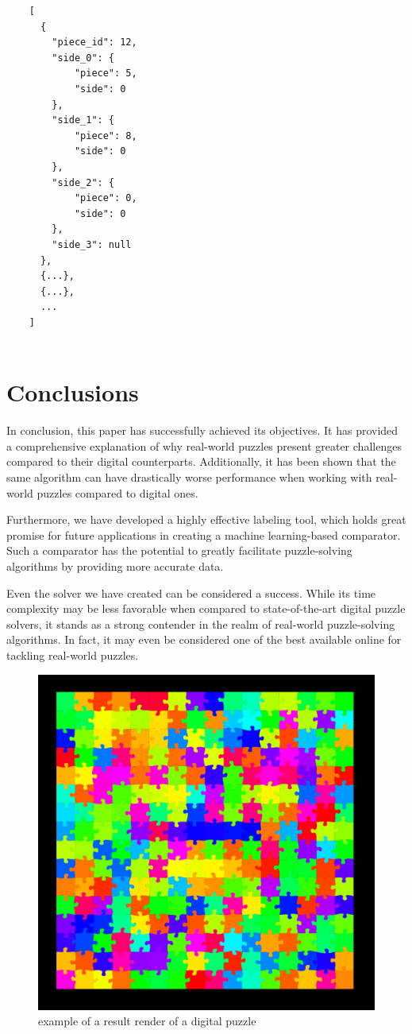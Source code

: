 \documentclass{article}
\begin{document}
\begin{minipage}{\textwidth}
  \begin{lstlisting}
    [
      {
        "piece_id": 12,
        "side_0": {
            "piece": 5,
            "side": 0
        },
        "side_1": {
            "piece": 8,
            "side": 0
        },
        "side_2": {
            "piece": 0,
            "side": 0
        },
        "side_3": null
      },
      {...},
      {...},
      ...
    ]
  
  \end{lstlisting}
\end{minipage}

\section{Conclusions}
In conclusion, this paper has successfully achieved its objectives.
It has provided a comprehensive explanation of why real-world puzzles
present greater challenges compared to their digital counterparts.
Additionally, it has been shown that the same algorithm can have drastically worse
performance when working with real-world puzzles compared to digital ones.

Furthermore, we have developed a highly effective labeling tool,
which holds great promise for future applications in creating a
machine learning-based comparator. Such a comparator has the potential
to greatly facilitate puzzle-solving algorithms by providing more
accurate data.

Even the solver we have created can be considered a success.
While its time complexity may be less favorable when compared to state-of-the-art
digital puzzle solvers, it stands as a strong contender in the realm of
real-world puzzle-solving algorithms. In fact, it may even be considered
one of the best available online for tackling real-world puzzles.

\begin{figure}[h]
  \caption{example of a result render of a digital puzzle}\label{fig:result_digital}
  \centering
  \includegraphics[height=0.6\textwidth]{pictures/result_digital.png}
\end{figure}
\end{document}
